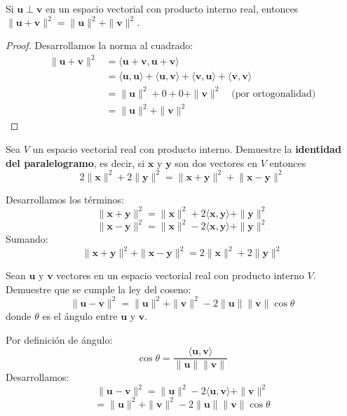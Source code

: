 \begin{theorem}
Si $\mathbf{u} \perp \mathbf{v}$ en un espacio vectorial con producto interno real, entonces \(
\|\mathbf{u} + \mathbf{v}\|^2 = \|\mathbf{u}\|^2 + \|\mathbf{v}\|^2
.\)
\begin{proof}
Desarrollamos la norma al cuadrado:
\begin{align*}
\|\mathbf{u} + \mathbf{v}\|^2 &= \langle \mathbf{u} + \mathbf{v}, \mathbf{u} + \mathbf{v} \rangle \\
&= \langle \mathbf{u}, \mathbf{u} \rangle + \langle \mathbf{u}, \mathbf{v} \rangle + \langle \mathbf{v}, \mathbf{u} \rangle + \langle \mathbf{v}, \mathbf{v} \rangle \\
&= \|\mathbf{u}\|^2 + 0 + 0 + \|\mathbf{v}\|^2 \quad \text{(por ortogonalidad)} \\
&= \|\mathbf{u}\|^2 + \|\mathbf{v}\|^2
\end{align*}
\end{proof}
\end{theorem}

\begin{prob}
Sea $V$ un espacio vectorial real con producto interno. Demuestre la \textbf{identidad del paralelogramo}, es decir, si $\mathbf{x}$ y $\mathbf{y}$ son dos vectores en $V$  entonces
\[
2\lVert \mathbf{x} \rVert^2+2\lVert \mathbf{y} \rVert^2=\lVert \mathbf{x+y} \rVert^2+\lVert \mathbf{x-y} \rVert^2
\]
\begin{myproof}
Desarrollamos los términos:
\[
\|\mathbf{x} + \mathbf{y}\|^2 = \|\mathbf{x}\|^2 + 2\langle \mathbf{x}, \mathbf{y} \rangle + \|\mathbf{y}\|^2
\]
\[
\|\mathbf{x} - \mathbf{y}\|^2 = \|\mathbf{x}\|^2 - 2\langle \mathbf{x}, \mathbf{y} \rangle + \|\mathbf{y}\|^2
\]
Sumando:
\[
\|\mathbf{x} + \mathbf{y}\|^2 + \|\mathbf{x} - \mathbf{y}\|^2 = 2\|\mathbf{x}\|^2 + 2\|\mathbf{y}\|^2
\]
\end{myproof}
\end{prob}

\begin{prob}
Sean $\mathbf{u}$ y $\mathbf{v}$ vectores en un espacio vectorial real con producto interno $V$. Demuestre que se cumple la ley del coseno:
\[
\|\mathbf{u}-\mathbf{v}\|^2 = \|\mathbf{u}\|^2 + \|\mathbf{v}\|^2 - 2\|\mathbf{u}\|\|\mathbf{v}\|\cos\theta
\]
donde $\theta$ es el ángulo entre $\mathbf{u}$ y $\mathbf{v}$.
\begin{myproof}
Por definición de ángulo:
\[
\cos \theta = \frac{\langle \mathbf{u}, \mathbf{v} \rangle}{\|\mathbf{u}\|\|\mathbf{v}\|}
\]
Desarrollamos:
\[
\|\mathbf{u} - \mathbf{v}\|^2 = \|\mathbf{u}\|^2 - 2\langle \mathbf{u}, \mathbf{v} \rangle + \|\mathbf{v}\|^2
\]
\[
= \|\mathbf{u}\|^2 + \|\mathbf{v}\|^2 - 2\|\mathbf{u}\|\|\mathbf{v}\|\cos\theta
\]
\end{myproof}
\end{prob}


